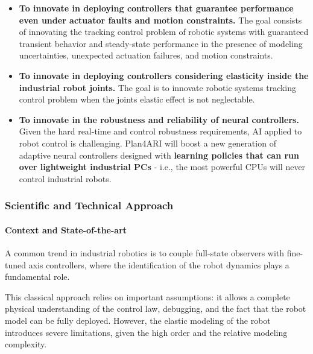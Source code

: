 \begin{itemize}[compact]
\item
  \textbf{To innovate in deploying controllers that guarantee
  performance even under actuator faults and motion constraints.} The
  goal consists of innovating the tracking control problem of robotic
  systems with guaranteed transient behavior and steady-state
  performance in the presence of modeling uncertainties, unexpected
  actuation failures, and motion constraints.
\item
  \textbf{To innovate in deploying controllers considering elasticity
  inside the industrial robot joints.} The goal is to innovate robotic
  systems\textquotesingle{} tracking control problem when the
  joints\textquotesingle{} elastic effect is not neglectable.
\item
  \textbf{To innovate in the robustness and reliability of neural
  controllers.} Given the hard real-time and control robustness
  requirements, AI applied to robot control is challenging. Plan4ARI
  will boost a new generation of adaptive neural controllers designed
  with \textbf{learning policies that can run over lightweight
  industrial PCs} - i.e., the most powerful CPUs will never control
  industrial robots.
\end{itemize}

\subsubsection{Scientific and Technical
Approach}\label{scientific-and-technical-approach-2}

\paragraph{Context and
State-of-the-art}\label{context-and-state-of-the-art-2}

A common trend in industrial robotics is to couple full-state observers
with fine-tuned axis controllers, where the identification of the robot
dynamics plays a fundamental role.

This classical approach relies on important assumptions: it allows a
complete physical understanding of the control law, debugging, and the
fact that the robot model can be fully deployed. However, the elastic
modeling of the robot introduces severe limitations, given the high
order and the relative modeling complexity.

